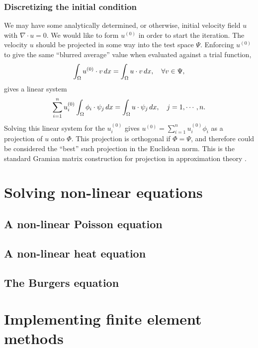\subsubsection{Discretizing the initial condition}
We may have some analytically determined, or otherwise, initial velocity field $u$ with $\nabla\cdot u = 0$.
We would like to form $u^{(0)}$ in order to start the iteration. The velocity $u$ should be projected in some way into the test space $\Psi$.
Enforcing $u^{(0)}$ to give the same ``blurred average'' value when evaluated against a trial function,
\begin{equation}\label{initial_velocity_projection}
    \int_{\Omega} u^{(0)}\cdot v\,dx = \int_{\Omega} u \cdot v\,dx,\quad \forall v \in \Psi,
\end{equation}
gives a linear system
\begin{equation}\label{initial_velocity_projection_linear_system}
    \sum_{i=1}^n u^{(0)}_i \int_{\Omega} \phi_i \cdot \psi_j\,dx = \int_{\Omega} u\cdot \psi_j\,dx,
    \quad j=1,\cdots,n.
\end{equation}
Solving this linear system for the $u^{(0)}_i$ gives $u^{(0)} = \sum_{i=1}^n u^{(0)}_i \phi_i$ as a projection of $u$ onto $\Phi$.
This projection is orthogonal if $\Phi = \Psi$, and therefore could be considered the ``best'' such projection in the Euclidean norm.
This is the standard Gramian matrix construction for projection in approximation theory \cite{approximation_theory}.


\section{Solving non-linear equations}
\subsection{A non-linear Poisson equation}
\subsection{A non-linear heat equation}
\subsection{The Burgers equation}

\section{Implementing finite element methods}
